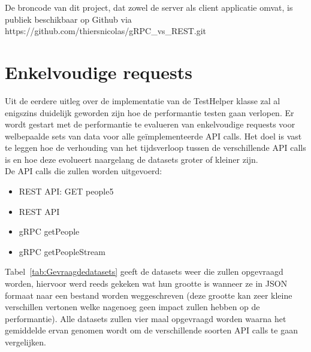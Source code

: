De broncode van dit project, dat zowel de server als client applicatie omvat, is publiek beschikbaar op Github via https://github.com/thiersnicolas/gRPC\_vs\_REST.git

\section{Enkelvoudige requests}
\label{enkelvoudigerequestsmethodologie}

Uit de eerdere uitleg over de implementatie van de TestHelper klasse zal al enigszins duidelijk geworden zijn hoe de performantie testen gaan verlopen.
Er wordt gestart met de performantie te evalueren van enkelvoudige requests voor welbepaalde sets van data voor alle geïmplementeerde API calls.
Het doel is vast te leggen hoe de verhouding van het tijdsverloop tussen de verschillende API calls is en hoe deze evolueert naargelang de
datasets groter of kleiner zijn.\\

De API calls die zullen worden uitgevoerd:
\begin{itemize}
    \item REST API: GET people5
    \item REST API
    \item gRPC getPeople
    \item gRPC getPeopleStream
\end{itemize}

Tabel~\ref{tab:Gevraagdedatasets} geeft de datasets weer die zullen opgevraagd worden, hiervoor werd reeds gekeken wat hun grootte is
wanneer ze in JSON formaat naar een bestand worden weggeschreven (deze grootte kan zeer kleine verschillen vertonen welke nagenoeg geen impact zullen hebben op de performantie).
Alle datasets zullen vier maal opgevraagd worden waarna het gemiddelde ervan genomen wordt om de verschillende soorten API calls te gaan vergelijken.\\

